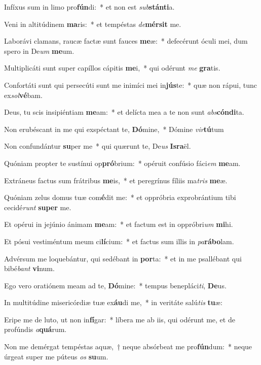 \item Infíxus sum in limo pro\textbf{fún}di:~* et non est \textit{sub}\textbf{stán}\textbf{ti}a.
\item Veni in altitúdinem \textbf{ma}ris:~* et tempéstas \textit{de}\textbf{mér}\textbf{sit} me.
\item Laborávi clamans, raucæ factæ sunt fauces \textbf{me}æ:~* defecérunt óculi mei, dum spero in De\textit{um} \textbf{me}um.
\item Multiplicáti sunt super capíllos cápitis \textbf{me}i,~* qui odérunt \textit{me} \textbf{gra}tis.
\item Confortáti sunt qui persecúti sunt me inimíci mei in\textbf{jús}te:~* quæ non rápui, tunc ex\textit{sol}\textbf{vé}bam.
\item Deus, tu scis insipiéntiam \textbf{me}am:~* et delícta mea a te non sunt \textit{abs}\textbf{cón}\textbf{di}ta.
\item Non erubéscant in me qui exspéctant te, \textbf{Dó}mine,~* Dómine \textit{vir}\textbf{tú}tum
\item Non confundántur \textbf{su}per me~* qui quærunt te, De\textit{us} \textbf{Is}\textbf{ra}ël.
\item Quóniam propter te sustínui op\textbf{pró}brium:~* opéruit confúsio fáci\textit{em} \textbf{me}am.
\item Extráneus factus sum frátribus \textbf{me}is,~* et peregrínus fíliis ma\textit{tris} \textbf{me}æ.
\item Quóniam zelus domus tuæ com\textbf{é}dit me:~* et oppróbria exprobrántium tibi cecidé\textit{runt} \textbf{su}\textbf{per} me.
\item Et opérui in jejúnio ánimam \textbf{me}am:~* et factum est in oppróbri\textit{um} \textbf{mi}hi.
\item Et pósui vestiméntum meum ci\textbf{lí}cium:~* et factus sum illis in \textit{pa}\textbf{rá}\textbf{bo}lam.
\item Advérsum me loquebántur, qui sedébant in \textbf{por}ta:~* et in me psallébant qui bibé\textit{bant} \textbf{vi}num.
\item Ego vero oratiónem meam ad te, \textbf{Dó}mine:~* tempus benepláci\textit{ti}, \textbf{De}us.
\item In multitúdine misericórdiæ tuæ ex\textbf{áu}di me,~* in veritáte salú\textit{tis} \textbf{tu}æ:
\item Eripe me de luto, ut non in\textbf{fí}gar:~* líbera me ab iis, qui odérunt me, et de profúndis \textit{a}\textbf{quá}rum.
\item Non me demérgat tempéstas aquæ,~† neque absórbeat me pro\textbf{fún}dum:~* neque úrgeat super me púteus \textit{os} \textbf{su}um.

